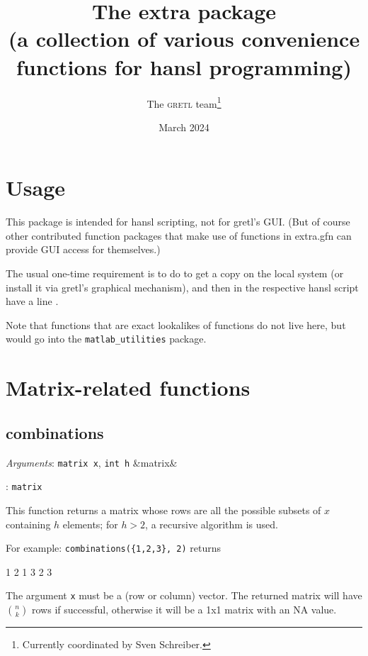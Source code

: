 \documentclass[11pt,english]{article}
\newcommand{\noun}[1]{\textsc{#1}}
\newcommand{\ArgRet}[2]{%
  {\it Arguments}: {#1}%
  \ifx&#2&%
  \else
  \par\smallskip\noindent {\it Return type}: \texttt{#2}
  \fi%
  \par\medskip\par%
  }
\begin{document}
\title{The extra package\\
(a collection of various convenience functions for hansl programming) }

\date{March 2024}

\author{The \noun{gretl} team\thanks{Currently coordinated by Sven
Schreiber.}}

\maketitle
\tableofcontents{}

\section{Usage}

This package is intended for hansl scripting, not for gretl's GUI.
(But of course other contributed function packages that make use of
functions in extra.gfn can provide GUI access for themselves.)

The usual one-time requirement is to do 
to get a copy on the local system (or install it via gretl's graphical
mechanism), and then in the respective hansl script have a line .

Note that functions that are exact lookalikes of 
functions do not live here, but would go into the
\texttt{matlab\_utilities} package.


\section{Matrix-related functions}

\subsection{combinations}

\ArgRet{\texttt{matrix x}, \texttt{int h}}{matrix} This function
returns a matrix whose rows are all the possible subsets of $x$
containing $h$ elements; for $h>2$, a recursive algorithm is used.

For example: \texttt{combinations(\{1,2,3\}, 2)} returns
\begin{code}
         1   2
         1   3
         2   3
\end{code}

The argument \texttt{x} must be a (row or column) vector. The returned
matrix will have $n \choose k$ rows if successful, otherwise it will be a 1x1
matrix with an NA value.
\end{document}
